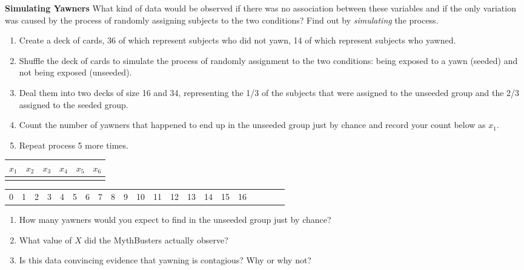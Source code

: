 \documentclass[10pt]{article}\usepackage[]{graphicx}\usepackage[]{color}
\newcommand{\ans}{\vspace{0.5in}}
\begin{document}
\textbf{Simulating Yawners} What kind of data would be observed if there was no association between these variables and if the only variation was caused by the process of randomly assigning subjects to the two conditions? Find out by \emph{simulating} the process.
\begin{enumerate}
  \item Create a deck of cards, 36 of which represent subjects who did not yawn, 14 of which represent subjects who yawned.
  \item Shuffle the deck of cards to simulate the process of randomly assignment to the two conditions: being exposed to a yawn (seeded) and not being exposed (unseeded).
  \item Deal them into two decks of size 16 and 34, representing the 1/3 of the subjects that were assigned to the unseeded group and the 2/3 assigned to the seeded group.
  \item Count the number of yawners that happened to end up in the unseeded group just by chance and record your count below as $x_1$.
  \item Repeat process 5 more times.
\end{enumerate}

\begin{center}
\begin{tabular}{|c|c|c|c|c|c|}
  \hline
  $x_1$ & $x_2$ & $x_3$ & $x_4$ & $x_5$ & $x_6$ \\
  \hline
  \hspace{0.75in} & \hspace{0.75in} & \hspace{0.75in} & \hspace{0.75in} & \hspace{0.75in} & \hspace{0.75in} \\[5ex]
  \hline
\end{tabular}
\end{center}

\vspace{2.5in}

\begin{center}
\begin{tabular}{|c|c|c|c|c|c|c|c|c|c|c|c|c|c|c|c|c|c|c|c|c|}
  \hline
  0 & 1 & 2 & 3 & 4 & 5 & 6 & 7 & 8 & 9 & 10 & 11 & 12 & 13 & 14 & 15 & 16 \\
\end{tabular}
\end{center}

\vspace{5mm}

\begin{enumerate}
  \item How many yawners would you expect to find in the unseeded group just by chance?
  \ans
  \item What value of $X$ did the MythBusters actually observe?
  \ans
  \item Is this data convincing evidence that yawning is contagious? Why or why not?
  \ans
\end{enumerate}
\end{document}

